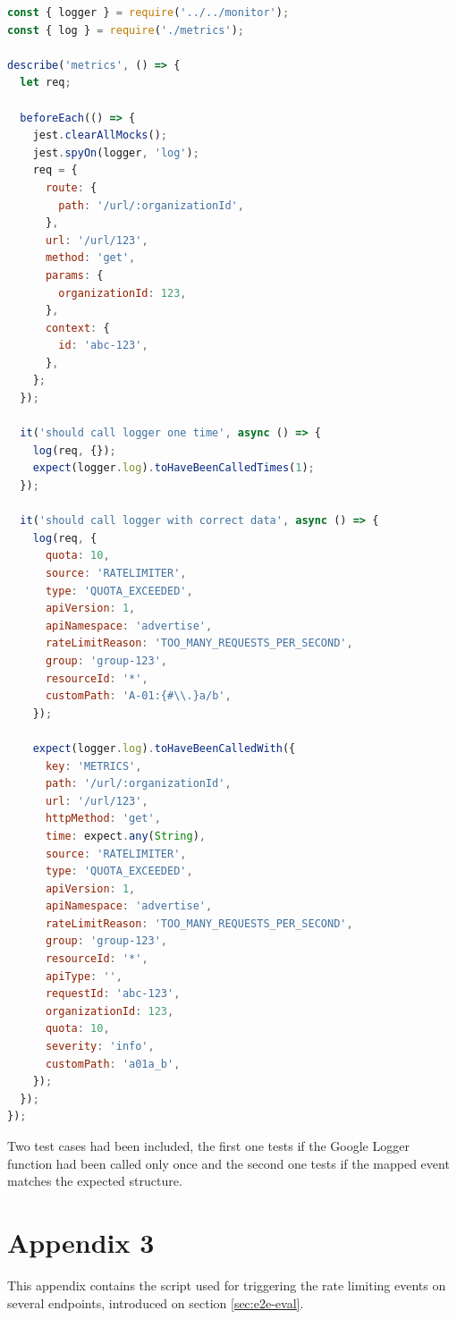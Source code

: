 \documentclass[english, 12pt, a4paper, sci, utf8, a-1b, online]{aaltothesis}
\begin{document}
\begin{lstlisting}[language=JavaScript,firstnumber=1]
const { logger } = require('../../monitor');
const { log } = require('./metrics');

describe('metrics', () => {
  let req;

  beforeEach(() => {
    jest.clearAllMocks();
    jest.spyOn(logger, 'log');
    req = {
      route: {
        path: '/url/:organizationId',
      },
      url: '/url/123',
      method: 'get',
      params: {
        organizationId: 123,
      },
      context: {
        id: 'abc-123',
      },
    };
  });

  it('should call logger one time', async () => {
    log(req, {});
    expect(logger.log).toHaveBeenCalledTimes(1);
  });

  it('should call logger with correct data', async () => {
    log(req, {
      quota: 10,
      source: 'RATELIMITER',
      type: 'QUOTA_EXCEEDED',
      apiVersion: 1,
      apiNamespace: 'advertise',
      rateLimitReason: 'TOO_MANY_REQUESTS_PER_SECOND',
      group: 'group-123',
      resourceId: '*',
      customPath: 'A-01:{#\\.}a/b',
    });

    expect(logger.log).toHaveBeenCalledWith({
      key: 'METRICS',
      path: '/url/:organizationId',
      url: '/url/123',
      httpMethod: 'get',
      time: expect.any(String),
      source: 'RATELIMITER',
      type: 'QUOTA_EXCEEDED',
      apiVersion: 1,
      apiNamespace: 'advertise',
      rateLimitReason: 'TOO_MANY_REQUESTS_PER_SECOND',
      group: 'group-123',
      resourceId: '*',
      apiType: '',
      requestId: 'abc-123',
      organizationId: 123,
      quota: 10,
      severity: 'info',
      customPath: 'a01a_b',
    });
  });
});
\end{lstlisting}

Two test cases had been included, the first one tests if the Google Logger function had been called only once and the second one tests if the mapped event matches the expected structure.

\clearpage
\section{Appendix 3}
\label{apx:bash-script}

This appendix contains the script used for triggering the rate limiting events on several endpoints, introduced on section \ref{sec:e2e-eval}.
\end{document}

